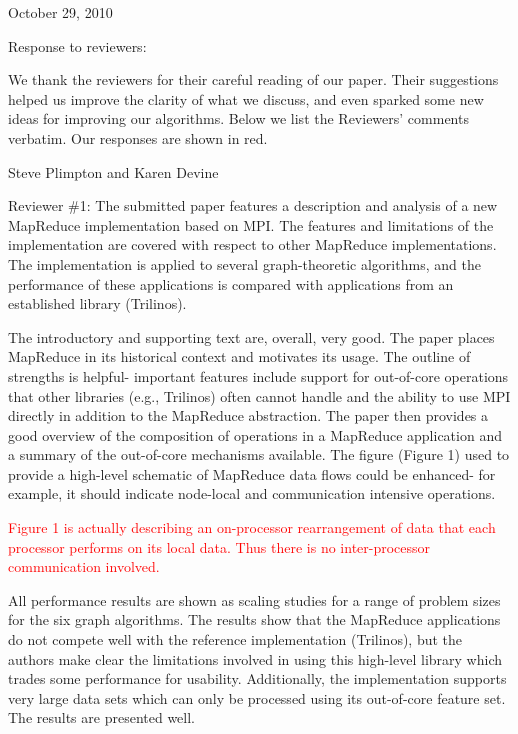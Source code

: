 \documentclass[11pt]{article}
\newcommand{\revise}[1]{\textcolor{red}{#1}}
\begin{document}
October 29, 2010

Response to reviewers:

We thank the reviewers for their careful reading of our paper.  Their
suggestions helped us improve the clarity of what we discuss, and even
sparked some new ideas for improving our algorithms.  Below we list
the Reviewers' comments verbatim.  Our responses are shown in red.

Steve Plimpton and Karen Devine

\vspace{0.5 in}

Reviewer \#1: The submitted paper features a description and analysis of a
new MapReduce implementation based on MPI.  The features and limitations
of the implementation are covered with respect to other MapReduce
implementations.  The implementation is applied to several
graph-theoretic algorithms, and the performance of these applications
is compared with applications from an established library (Trilinos).

The introductory and supporting text are, overall, very good.  The
paper places MapReduce in its historical context and motivates its
usage.  The outline of strengths is helpful- important features
include support for out-of-core operations that other libraries (e.g.,
Trilinos) often cannot handle and the ability to use MPI directly in
addition to the MapReduce abstraction.  The paper then provides a good
overview of the composition of operations in a MapReduce application
and a summary of the out-of-core mechanisms available.  The figure
(Figure 1) used to provide a high-level schematic of MapReduce data
flows could be enhanced- for example, it should indicate node-local
and communication intensive operations.

\revise{Figure 1 is actually describing an on-processor rearrangement
of data that each processor performs on its local data.  Thus there is
no inter-processor communication involved.}

All performance results are shown as scaling studies for a range of
problem sizes for the six graph algorithms.  The results show that the
MapReduce applications do not compete well with the reference
implementation (Trilinos), but the authors make clear the limitations
involved in using this high-level library which trades some
performance for usability.  Additionally, the implementation supports
very large data sets which can only be processed using its out-of-core
feature set.  The results are presented well.
\end{document}
